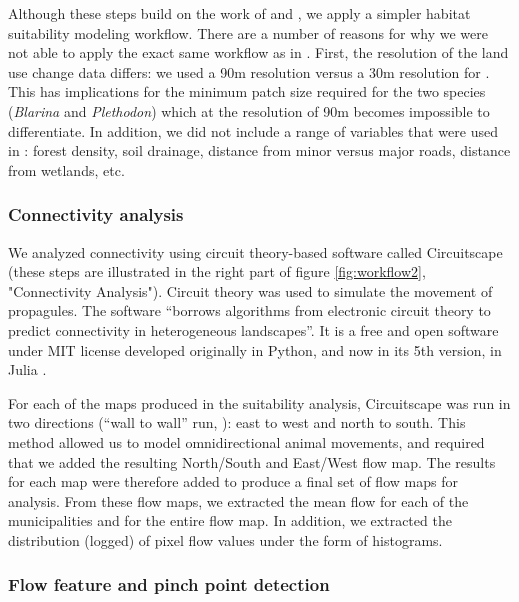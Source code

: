 Although these steps build on the work of \cite{albert_applying_2017} and \cite{rayfield_priorisation_2018}, we apply a simpler habitat suitability modeling workflow. There are a number of reasons for why we were not able to apply the exact same workflow as  in \citeauthor{rayfield_priorisation_2018}. First, the resolution of the land use change data differs: we used a 90m resolution versus a 30m resolution for \citeauthor{rayfield_priorisation_2018}. This has implications for the minimum patch size required for the two species (\textit{Blarina} and \textit{Plethodon}) which at the resolution of 90m becomes impossible to differentiate. In addition, we did not include a range of variables that were used in \citeauthor{rayfield_priorisation_2018}: forest density, soil drainage, distance from minor versus major roads, distance from wetlands, etc.\\

\subsubsection{Connectivity analysis}

We analyzed connectivity using circuit theory-based software called Circuitscape (these steps are illustrated in the right part of figure \ref{fig:workflow2}, "Connectivity Analysis"). Circuit theory was used to simulate the movement of propagules. The software “borrows algorithms from electronic circuit theory to predict connectivity in heterogeneous landscapes''. It is a free and open software under MIT license developed originally in Python, and now in its 5th version, in Julia \citep{circuitjulia}.

For each of the maps produced in the suitability analysis, Circuitscape was run in two directions (“wall to wall” run, \cite{mcrae_conserving_2016}): east to west and north to south. This method allowed us to model omnidirectional animal movements, and required that we added the resulting North/South and East/West flow map. The results for each map were therefore added to produce a final set of flow maps for analysis. From these flow maps, we extracted the mean flow for each of the municipalities and for the entire flow map. In addition, we extracted the distribution (logged) of pixel flow values under the form of histograms. \\

\subsubsection*{Flow feature and pinch point detection}

